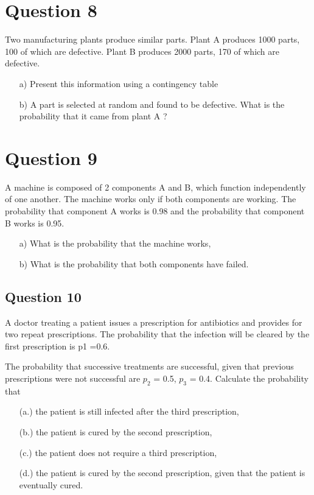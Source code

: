 \documentclass[a4paper,12pt]{article}
\begin{document}
\section*{Question 8}
Two manufacturing plants produce similar parts. Plant A produces 1000 parts, 100 of which are defective. Plant B produces 2000 parts, 170 of which are defective. 
\begin{itemize}
\item[a)] Present this information using a contingency table

\item[b)] A part is selected at random and found to be defective. What is the probability that it came from plant A ?
\end{itemize}
\section*{Question 9}
A machine is composed of 2 components A and B, which function independently of one another. The machine works only if both components are working. The probability that component A works is 0.98 and the probability that component B works is 0.95.
\begin{itemize}
\item[a)] What is the probability that the machine works, 
\item[b)] What is the probability that both components have failed.
\end{itemize}

\subsection*{Question 10}

A doctor treating a patient issues a prescription for antibiotics and provides for two repeat prescriptions. The probability that the infection will be cleared by the first prescription is p1 =0.6. 


The probability that successive treatments are successful, given that previous prescriptions were not successful are $p_2$ = 0.5, $p_3$ = 0.4. Calculate the probability that  

\begin{itemize}   
\item[(a.)] the patient is still infected after the third prescription,
\item[(b.)] the patient is cured by the second prescription,
\item[(c.)] the patient does not require a third prescription,
\item[(d.)] the patient is cured by the second prescription, given that the patient is eventually cured.
\end{itemize}
\end{document}
